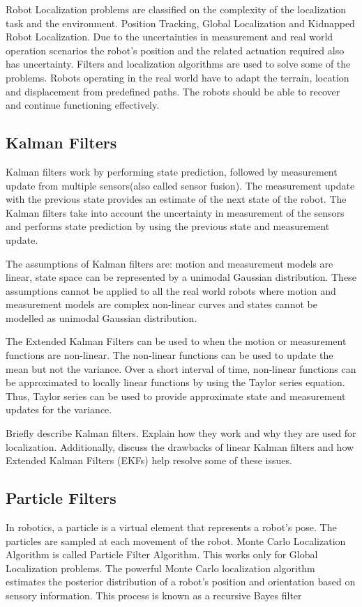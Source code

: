 \documentclass[10pt,journal,compsoc]{IEEEtran}
\begin{document}
Robot Localization problems are classified on the complexity of the localization task and the environment. Position Tracking, Global Localization and Kidnapped Robot Localization.
Due to the uncertainties in measurement and real world operation scenarios the robot's position and the related actuation required also has uncertainty. Filters and localization algorithms are used to solve some of the problems. Robots operating in the real world have to adapt the terrain, location and displacement from predefined paths. The robots should be able to recover and continue functioning effectively.

\subsection{Kalman Filters}
Kalman filters work by performing state prediction, followed by measurement update from multiple sensors(also called sensor fusion). The measurement update with the previous state provides an estimate of the next state of the robot. The Kalman filters take into account the uncertainty in measurement of the sensors and performs state prediction by using the previous state and measurement update.
 
The assumptions of Kalman filters are: motion and measurement models are linear, state space can be represented by a unimodal Gaussian distribution. These assumptions cannot be applied to all the real world robots where motion and measurement models are complex non-linear curves and states cannot be modelled as unimodal Gaussian distribution.


The Extended Kalman Filters can be used to when the motion or measurement functions are non-linear. The non-linear functions can be used to update the mean but not the variance. Over a short interval of time, non-linear functions can be approximated to locally linear functions by using the Taylor series equation. Thus, Taylor series\cite{taylor} can be used to provide approximate state and measurement updates for the variance. 


Briefly describe Kalman filters. Explain how they work and why they are used for localization. Additionally, discuss the drawbacks of linear Kalman filters and how Extended Kalman Filters (EKFs) help resolve some of these issues.

\subsection{Particle Filters}
In robotics, a particle is a virtual element that represents a robot's pose. The particles are sampled at each movement of the robot. Monte Carlo Localization Algorithm is called Particle Filter Algorithm. This works only for Global Localization problems.
The powerful Monte Carlo localization algorithm estimates the posterior distribution of a robot’s position and orientation based on sensory information. This process is known as a recursive Bayes filter
\end{document}
